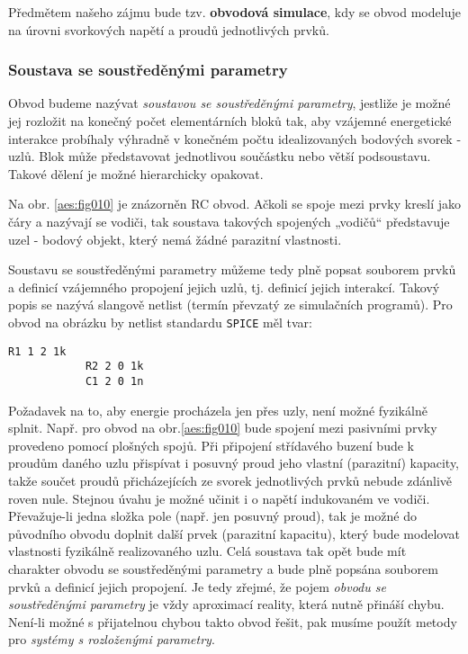         Předmětem našeho zájmu bude tzv. \textbf{obvodová simulace}, kdy se obvod modeluje na úrovni
        svorkových napětí a proudů jednotlivých prvků.
      
        \subsubsection{Soustava se soustředěnými parametry}
          Obvod budeme nazývat \emph{soustavou se soustředěnými parametry}, jestliže je možné jej
          rozložit na konečný počet elementárních bloků tak, aby vzájemné energetické interakce
          probíhaly výhradně v konečném počtu idealizovaných bodových svorek - uzlů. Blok může
          představovat jednotlivou součástku nebo větší podsoustavu. Takové dělení je možné
          hierarchicky opakovat.


          Na obr. \ref{aes:fig010} je znázorněn RC obvod. Ačkoli se spoje mezi prvky kreslí jako
          čáry a nazývají se vodiči, tak soustava takových spojených „vodičů“ představuje uzel -
          bodový objekt, který nemá žádné parazitní vlastnosti. 
          

          Soustavu se soustředěnými parametry můžeme tedy plně popsat souborem prvků a definicí
          vzájemného propojení jejich uzlů, tj. definicí jejich interakcí. Takový popis se nazývá
          slangově netlist (termín převzatý ze simulačních programů). Pro obvod na obrázku by
          netlist standardu \texttt{SPICE} měl tvar:
          \begin{lstlisting}[gobble=8, xrightmargin=13em]
            R1 1 2 1k
            R2 2 0 1k
            C1 2 0 1n
          \end{lstlisting}

          Požadavek na to, aby energie procházela jen přes uzly, není možné fyzikálně splnit. Např.
          pro obvod na obr.\ref{aes:fig010} bude spojení mezi pasivními prvky provedeno pomocí
          plošných spojů. Při připojení střídavého buzení bude k proudům daného uzlu přispívat i
          posuvný proud jeho vlastní (parazitní) kapacity, takže součet proudů přicházejících ze
          svorek jednotlivých prvků nebude zdánlivě roven nule. Stejnou úvahu je možné učinit i o
          napětí indukovaném ve vodiči. Převažuje-li jedna složka pole (např. jen posuvný proud),
          tak je možné do původního obvodu doplnit další prvek (parazitní kapacitu), který bude
          modelovat vlastnosti fyzikálně realizovaného uzlu. Celá soustava tak opět bude mít
          charakter obvodu se soustředěnými parametry a bude plně popsána souborem prvků a definicí
          jejich propojení. Je tedy zřejmé, že pojem \emph{obvodu se soustředěnými parametry} je
          vždy aproximací reality, která nutně přináší chybu. Není-li možné s přijatelnou chybou
          takto obvod řešit, pak musíme použít metody pro \emph{systémy s rozloženými parametry}.

